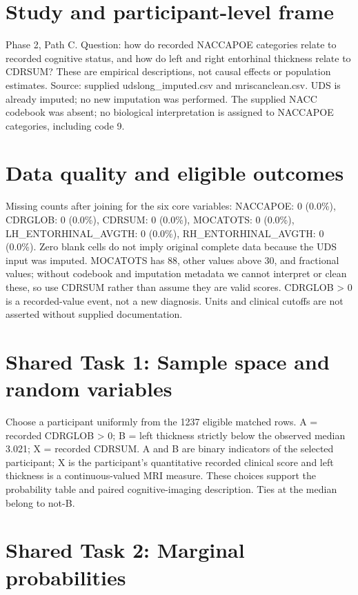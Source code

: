 \documentclass[11pt]{article}
\begin{document}
\section*{Study and participant-level frame}

Phase 2, Path C. Question: how do recorded NACCAPOE categories relate to recorded cognitive status, and how do left and right entorhinal thickness relate to CDRSUM? These are empirical descriptions, not causal effects or population estimates. Source: supplied udslong\_imputed.csv and mriscanclean.csv. UDS is already imputed; no new imputation was performed. The supplied NACC codebook was absent; no biological interpretation is assigned to NACCAPOE categories, including code 9.

\section*{Data quality and eligible outcomes}

Missing counts after joining for the six core variables: NACCAPOE: 0 (0.0\%), CDRGLOB: 0 (0.0\%), CDRSUM: 0 (0.0\%), MOCATOTS: 0 (0.0\%), LH\_ENTORHINAL\_AVGTH: 0 (0.0\%), RH\_ENTORHINAL\_AVGTH: 0 (0.0\%). Zero blank cells do not imply original complete data because the UDS input was imputed. MOCATOTS has 88, other values above 30, and fractional values; without codebook and imputation metadata we cannot interpret or clean these, so use CDRSUM rather than assume they are valid scores. CDRGLOB > 0 is a recorded-value event, not a new diagnosis. Units and clinical cutoffs are not asserted without supplied documentation.

\section*{Shared Task 1: Sample space and random variables}

Choose a participant uniformly from the 1237 eligible matched rows. A = recorded CDRGLOB > 0; B = left thickness strictly below the observed median 3.021; X = recorded CDRSUM. A and B are binary indicators of the selected participant; X is the participant's quantitative recorded clinical score and left thickness is a continuous-valued MRI measure. These choices support the probability table and paired cognitive-imaging description. Ties at the median belong to not-B.

\section*{Shared Task 2: Marginal probabilities}
\end{document}
